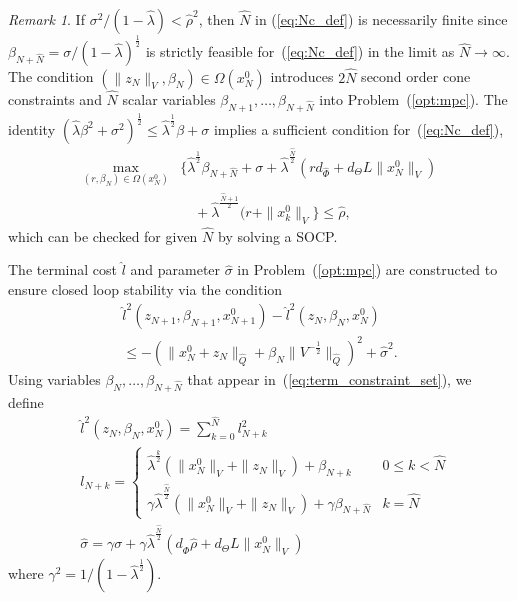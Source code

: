 \documentclass{IEEEtran}
\theoremstyle{definition}
\theoremstyle{remark}
\newtheorem{remark}{Remark}
\begin{document}
\begin{remark}
If $\sigma^2/(1-\hat{\lambda}) < \hat{\rho}^2$, then
$\hat{N}$ in (\ref{eq:Nc_def}) is necessarily finite since
$\beta_{N+\hat{N}} = \sigma/(1-\hat{\lambda})^{\frac{1}{2}}$ is strictly feasible for~(\ref{eq:Nc_def}) in the limit as ${\hat{N}}\to\infty$.
%
The condition $(\|z_N\|_V,\beta_N)\in \Omega(x^0_N)$ introduces $2\hat{N}$ second order cone constraints and $\hat{N}$ scalar variables $\beta_{N+1},\ldots,\beta_{N+\hat{N}}$ into Problem~(\ref{opt:mpc}). 
%
The identity $(\hat{\lambda}\beta^2 + \sigma^2)^{\frac{1}{2}} \leq \hat{\lambda}^{\frac{1}{2}}\beta + \sigma$ implies a sufficient condition for~(\ref{eq:Nc_def}),
\begin{align}
\max_{(r,\beta_N)\in\Omega(x^0_N)} & \bigl\{
\hat{\lambda}^\frac{1}{2}\beta_{N+\hat{N}} + \sigma 
+ \hat{\lambda}^\frac{\hat{N}}{2}\! (r d_{\hat{\Phi}} +  d_\Theta L \|x^0_N\|_V) 
\nonumber \\
&\quad + \hat{\lambda}^\frac{\hat{N}+1}{2} (r +  \|x_k^0\|_V \bigr\} 
\leq \hat{\rho} ,
\label{eq:Nc_check}
\end{align}
which can be checked for given $\hat{N}$ by solving a SOCP. 
\end{remark}

The terminal cost $\hat{l}$ and parameter $\hat{\sigma}$ in Problem~(\ref{opt:mpc}) are constructed to ensure closed loop stability via the condition
\begin{multline}\label{eq:term_cost}
\hat{l}^2(z_{N+1},\beta_{N+1},x^0_{N+1}) - \hat{l}^2(z_N,\beta_N,x^0_N) 
\\
\leq -(\|x^0_N+z_N\|_{\hat{Q}} + \beta_N \|V^{-\frac{1}{2}}\|_{\hat{Q}})^2 + \hat{\sigma}^2 .
\end{multline}
Using variables $\beta_{N},\ldots,\beta_{N+\hat{N}}$ that appear in~(\ref{eq:term_constraint_set}), we define
\begin{align}
& 
\hat{l}^2(z_N,\beta_N,x^0_N) = \sum_{k=0}^{\hat{N}} 
l_{N+k}^2
\label{eq:hat_l_def}
\\
& l_{N+k} = \begin{cases}
\hat{\lambda}^{\frac{k}{2}}(\|x^0_N\|_V + \|z_N\|_V) + \beta_{N+k} & 0\leq k <\hat{N}
\\
\gamma \hat{\lambda}^{\frac{\hat{N}}{2}}(\|x^0_N\|_V + \|z_N\|_V) + \gamma\beta_{N+\hat{N}} &
k = \hat{N}
\end{cases}
\nonumber
\\
& \hat{\sigma} = 
\gamma \sigma + 
     \gamma  \hat{\lambda}^{\frac{\hat{N}}{2}} (d_{\hat{\Phi}}\hat{\rho} + d_\Theta L\|x^0_N\|_V)
\label{eq:hat_sigma_def}
\end{align}
where
$\gamma^2 = 1/(1-\hat{\lambda}^{\frac{1}{2}})$.
\end{document}
